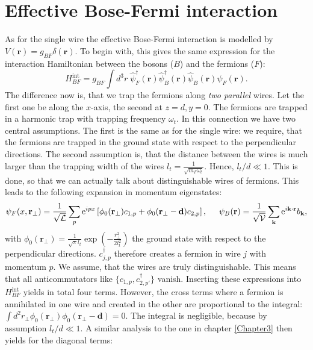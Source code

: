 \section{Effective Bose-Fermi interaction} 
As for the single wire the effective Bose-Fermi interaction is modelled by $V(\mathbf{r}) = g_{BF}\delta(\mathbf{r})$. To begin with, this gives the same expression for the interaction Hamiltonian between the bosons ($B$) and the fermions ($F$):
\begin{equation}
H_{BF}^\text{int} = g_{BF}\int d^3 r \; \hat{\psi}_F^\dagger(\mathbf{r}) \hat{\psi}_B^\dagger(\mathbf{r})\hat{\psi}_B(\mathbf{r})\hat{\psi}_F(\mathbf{r}).
\end{equation}
The difference now is, that we trap the fermions along \textit{two parallel} wires. Let the first one be along the $x$-axis, the second at $z=d, y=0$. The fermions are trapped in a harmonic trap with trapping frequency $\omega_t$. In this connection we have two central assumptions. The first is the same as for the single wire: we require, that the fermions are trapped in the ground state with respect to the perpendicular directions. The second assumption is, that the distance between the wires is much larger than the trapping width of the wires $l_t = \frac{1}{\sqrt{m_F\omega_t}}$. Hence, $l_t/d \ll 1$. This is done, so that we can actually talk about distinguishable wires of fermions. This leads to the following expansion in momentum eigenstates:
\begin{equation}
\psi_F(x,\mathbf{r}_\perp) = \frac{1}{\sqrt{\mathcal{L}}}\sum_p \text{e}^{ipx} \left[\phi_0(\mathbf{r}_\perp) c_{1,p} + \phi_0(\mathbf{r}_\perp-\mathbf{d}) c_{2,p}\right], \hspace{0.5cm} \psi_B(\mathbf{r}) = \frac{1}{\sqrt{\mathcal{V}}}\sum_{\mathbf{k}} \text{e}^{i\mathbf{k}\cdot \mathbf{r}} b_\mathbf{k}, 
\end{equation}  
with $\phi_0(\mathbf{r}_\perp) = \frac{1}{\sqrt{\pi}l_t}\exp\left(-\frac{r_\perp^2}{2l_t^2}\right)$ the ground state with respect to the perpendicular directions. $c^\dagger_{j,p}$ therefore creates a fermion in wire $j$ with momentum $p$. We assume, that the wires are truly distinguishable. This means that all anticommutators like $\{c_{1,p}, c^\dagger_{2,p'}\}$ vanish. Inserting these expressions into $H_{BF}^\text{int}$ yields in total four terms. However, the cross terms where a fermion is annihilated in one wire and created in the other are proportional to the integral: $\int d^2 r_\perp \phi_0(\mathbf{r}_\perp)\phi_0(\mathbf{r}_\perp-\mathbf{d}) = 0$. The integral is negligible, because by assumption $l_t/d \ll 1$. A similar analysis to the one in chapter \ref{Chapter3} then yields for the diagonal terms:
